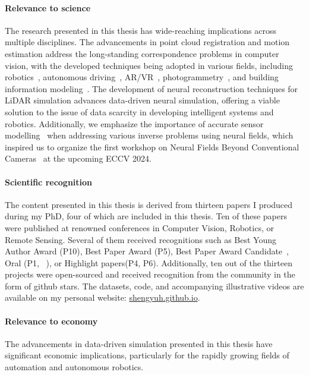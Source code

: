 \paragraph{Relevance to science}
The research presented in this thesis has wide-reaching implications across multiple disciplines. The advancements in point cloud registration and motion estimation address the long-standing correspondence problems in computer vision, with the developed techniques being adopted in various fields, including robotics~\cite{wen2024foundationpose}, autonomous driving~\cite{seidenschwarz2024semoli}, AR/VR~\cite{Zhao_2023_ICCV}, photogrammetry~\cite{xu2023point_isprs}, and building information modeling~\cite{rashdi2022scanning}. The development of neural reconstruction techniques for LiDAR simulation advances data-driven neural simulation, offering a viable solution to the issue of data scarcity in developing intelligent systems and robotics. Additionally, we emphasize the importance of accurate sensor modelling~\cite{ehret2024radar,klinghoffer2024platonerf} when addressing various inverse problems using neural fields, which inspired us to organize the first workshop on Neural Fields Beyond Conventional Cameras~\cite{nfcc} at the upcoming ECCV 2024.


\paragraph{Scientific recognition}
The content presented in this thesis is derived from thirteen papers I produced during my PhD, four of which are included in this thesis. Ten of these papers were published at renowned conferences in Computer Vision, Robotics, or Remote Sensing. Several of them received recognitions such as Best Young Author Award (P10), Best Paper Award (P5), Best Paper Award Candidate~\cite{ke2023marigold}, Oral (P1, ~\cite{ke2023marigold}), or Highlight papers(P4, P6). Additionally, ten out of the thirteen projects were open-sourced and received recognition from the community in the form of github stars. The datasets, code, and accompanying illustrative videos are available on my personal website: \url{shengyuh.github.io}.

\paragraph{Relevance to economy}
The advancements in data-driven simulation presented in this thesis have significant economic implications, particularly for the rapidly growing fields of automation and autonomous robotics.


